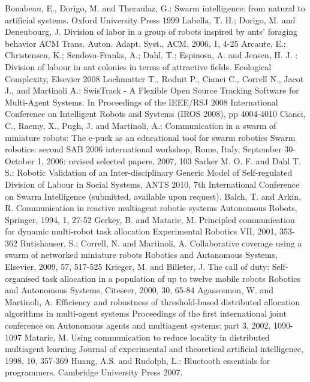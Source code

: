 \documentclass[letterpaper, 10 pt, times, conference]{ieeeconf} %
\begin{document}
\begin{thebibliography}{99}
Bonabeau, E., Dorigo, M. and Theraulaz, G.:
Swarm intelligence: from natural to artificial systems.
Oxford University Press 1999
Labella, T. H.; Dorigo, M. and Deneubourg, J. Division of labor in a group of robots inspired by ants' foraging behavior ACM Trans. Auton. Adapt. Syst., ACM, 2006, 1, 4-25
Arcaute, E.; Christensen, K.; Sendova-Franks, A.; Dahl, T.; Espinosa, A. and Jensen, H. J. : 
Division of labour in ant colonies in terms of attractive fields. 
Ecological Complexity, Elsevier 2008
Lochmatter T., Roduit P., Cianci C., Correll N., Jacot J., and Martinoli A.: 
SwisTrack - A Flexible Open Source Tracking Software for Multi-Agent Systems. 
In Proceedings of the IEEE/RSJ 2008 International Conference on Intelligent Robots and Systems (IROS 2008), pp 4004-4010
Cianci, C., Raemy, X., Pugh, J. and Martinoli, A.: Communication in a swarm of miniature robots: The e-puck as an educational tool for swarm robotics Swarm robotics: second SAB 2006 international workshop, Rome, Italy, September 30-October 1, 2006: revised selected papers, 2007, 103
Sarker M. O. F. and Dahl T. S.: Robotic Validation of an Inter-disciplinary Generic
Model of Self-regulated Division of Labour in Social Systems, ANTS 2010, 7th International Conference on Swarm Intelligence (submitted, available upon request).
Balch, T. and Arkin, R. Communication in reactive multiagent robotic systems Autonomous Robots, Springer, 1994, 1, 27-52
Gerkey, B. and Mataric, M. Principled communication for dynamic multi-robot task allocation Experimental Robotics VII, 2001, 353-362
Rutishauser, S.; Correll, N. and Martinoli, A. Collaborative coverage using a swarm of networked miniature robots Robotics and Autonomous Systems, Elsevier, 2009, 57, 517-525
Krieger, M. and Billeter, J. The call of duty: Self-organised task allocation in a population of up to twelve mobile robots Robotics and Autonomous Systems, Citeseer, 2000, 30, 65-84
Agassounon, W. and Martinoli, A. Efficiency and robustness of threshold-based distributed allocation algorithms in multi-agent systems Proceedings of the first international joint conference on Autonomous agents and multiagent systems: part 3, 2002, 1090-1097
Mataric, M. Using communication to reduce locality in distributed multiagent learning Journal of experimental and theoretical artificial intelligence, 1998, 10, 357-369
Huang, A.S. and Rudolph, L.:
Bluetooth essentials for programmers.
Cambridge University Press 2007.
%
%
\end{thebibliography}
\end{document}
